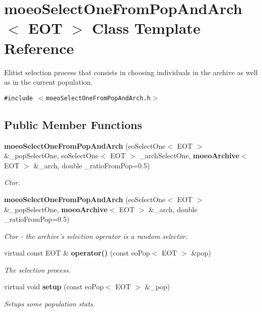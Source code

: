 \section{moeo\-Select\-One\-From\-Pop\-And\-Arch$<$ EOT $>$ Class Template Reference}
\label{classmoeoSelectOneFromPopAndArch}
Elitist selection process that consists in choosing individuals in the archive as well as in the current population.  


{\tt \#include $<$moeo\-Select\-One\-From\-Pop\-And\-Arch.h$>$}

\subsection*{Public Member Functions}
\begin{CompactItemize}
\item 
{\bf moeo\-Select\-One\-From\-Pop\-And\-Arch} (eo\-Select\-One$<$ EOT $>$ \&\_\-pop\-Select\-One, eo\-Select\-One$<$ EOT $>$ \_\-arch\-Select\-One, {\bf moeo\-Archive}$<$ EOT $>$ \&\_\-arch, double \_\-ratio\-From\-Pop=0.5)
\begin{CompactList}\small\item\em Ctor. \item\end{CompactList}\item 
{\bf moeo\-Select\-One\-From\-Pop\-And\-Arch} (eo\-Select\-One$<$ EOT $>$ \&\_\-pop\-Select\-One, {\bf moeo\-Archive}$<$ EOT $>$ \&\_\-arch, double \_\-ratio\-From\-Pop=0.5)
\begin{CompactList}\small\item\em Ctor - the archive's selection operator is a random selector. \item\end{CompactList}\item 
virtual const EOT \& {\bf operator()} (const eo\-Pop$<$ EOT $>$ \&pop)\label{classmoeoSelectOneFromPopAndArch_3c97abfde2dd9959ae4db4c32038017d}

\begin{CompactList}\small\item\em The selection process. \item\end{CompactList}\item 
virtual void {\bf setup} (const eo\-Pop$<$ EOT $>$ \&\_\-pop)\label{classmoeoSelectOneFromPopAndArch_a2acc5ddcf045c0c63c22f8d04274858}

\begin{CompactList}\small\item\em Setups some population stats. \item\end{CompactList}\end{CompactItemize}

